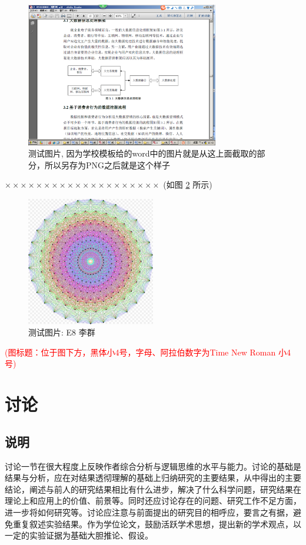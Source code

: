 \documentclass[a4paper]{article}
\theoremstyle{definition}
\theoremstyle{plain}
\theoremstyle{remark}
\newcommand{\reffig}[1]{图 \ref{#1}}
\begin{document}
\begin{figure}[H]
	\centering
	\includegraphics[width=0.75\textwidth]{testmindmap}
	\caption{测试图片, 因为学校模板给的word中的图片就是从这上面截取的部分，所以另存为PNG之后就是这个样子}
	\label{testfig}
\end{figure}
$ \times\times\times\times\times\times\times\times\times\times\times\times\times\times\times\times\times\times\times\times $  (如\reffig{E8} 所示)
\begin{figure}[H]
	\centering
	\includegraphics[width=0.5\textwidth]{E8Petrie}
	\caption{测试图片: E8 李群}
	\label{E8}
\end{figure}
\textcolor{red}{(图标题：位于图下方，黑体小4号，字母、阿拉伯数字为Time New Roman 小4号)}


\section{讨论}
\subsection{说明}
讨论一节在很大程度上反映作者综合分析与逻辑思维的水平与能力。讨论的基础是结果与分析，应在对结果透彻理解的基础上归纳研究的主要结果，从中得出的主要结论，阐述与前人的研究结果相比有什么进步，解决了什么科学问题，研究结果在理论上和应用上的价值、前景等。同时还应讨论存在的问题、研究工作不足方面，进一步将如何研究等。讨论应注意与前面提出的研究目的相呼应，要言之有据，避免重复叙述实验结果。作为学位论文，鼓励活跃学术思想，提出新的学术观点，以一定的实验证据为基础大胆推论、假设。
\end{document}
